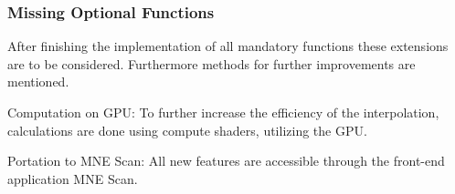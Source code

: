 \subsubsection{Missing Optional Functions}
After finishing the implementation of all mandatory functions these extensions are to be considered. Furthermore methods for further improvements are mentioned.  

\begin{aims}
	\item[\hspace*{11mm} Computation on GPU:]To further increase the efficiency of the interpolation, calculations are done using compute                							 shaders, utilizing the GPU. 
	\item[\hspace*{11mm} Portation to MNE Scan:]All new features are accessible through the front-end application MNE Scan.
\end{aims}